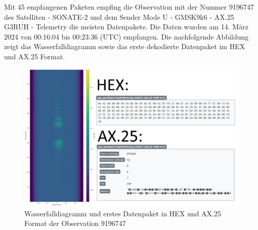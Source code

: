 Mit 45 empfangenen Paketen empfing die Observation mit der Nummer 9196747 des Satelliten  - SONATE-2\grqq{}  und dem Sender \glqq Mode U - GMSK9k6 - AX.25 G3RUH - Telemetry\grqq{} die meisten Datenpakete. Die Daten wurden am 14. März 2024 von 00:16:04 bis 00:23:36 (UTC) empfangen. Die nachfolgende Abbildung zeigt das Wasserfalldiagramm sowie das erste dekodierte Datenpaket im HEX und AX.25 Format.

\begin{figure} [H]
	\centering
	\includegraphics[width=\linewidth]{../ref/qha_successfull_operation.png}
	\caption{Wasserfalldiagramm und erstes Datenpaket in HEX und AX.25 Format der Observation 9196747 \cite{noauthor_satnogs_qfh_observation_nodate}}
	\label{fig:qha_successfull_observation}
\end{figure}